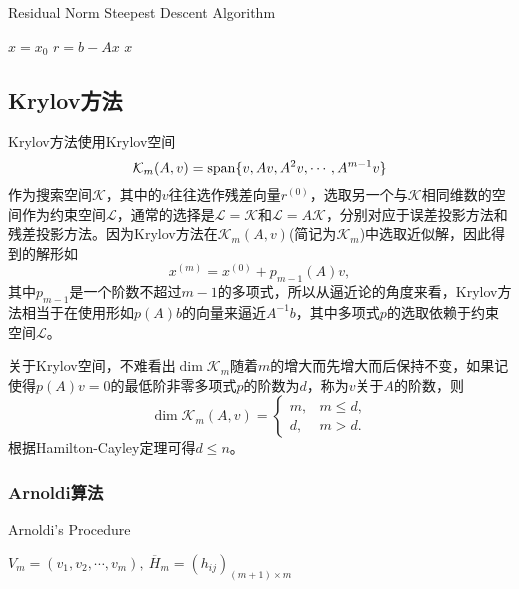 \documentclass[a4paper,10pt]{ctexart}
\begin{document}
\begin{algorithm}[htbp]
    \caption{Residual Norm Steepest Descent Algorithm}\label{alg:RSD}
    $ x = x_0 $\;
    $ r = b - Ax $\;
    \Return $ x $\;
\end{algorithm}
\newpage
\subsection{Krylov方法}
Krylov方法使用Krylov空间
\begin{equation}
    \mathcal{K}_m(A, v) = {\rm span}\{v, Av, A^2v, \cdots , A^{m-1}v\}
\end{equation}
作为搜索空间$ \mathcal{K} $，其中的$ v $往往选作残差向量$ r^{(0)} $，选取另一个与$ \mathcal{K} $相同维数的空间作为约束空间$ \mathcal{L} $，通常的选择是$ \mathcal{L} = \mathcal{K} $和$ \mathcal{L} = A \mathcal{K} $，分别对应于误差投影方法和残差投影方法。因为Krylov方法在$ \mathcal{K}_m(A,v) $(简记为$ \mathcal{K}_m $)中选取近似解，因此得到的解形如
\[
    x^{(m)} = x^{(0)} + p_{m-1}(A)v,
\]
其中$ p_{m-1} $是一个阶数不超过$ m-1 $的多项式，所以从逼近论的角度来看，Krylov方法相当于在使用形如$ p(A)b $的向量来逼近$ A^{-1}b $，其中多项式$ p $的选取依赖于约束空间$ \mathcal{L} $。

关于Krylov空间，不难看出$ \dim \mathcal{K}_m $随着$ m $的增大而先增大而后保持不变，如果记使得$ p(A)v=0 $的最低阶非零多项式$ p $的阶数为$ d $，称为$ v $关于$ A $的阶数，则
\[
    \dim \mathcal{K}_m(A,v) = \begin{cases}
        m, & m\leqslant d,\\
        d, & m>d.
    \end{cases}
\]
根据Hamilton-Cayley定理可得$ d\leqslant n $。

\subsubsection{Arnoldi算法}
\begin{algorithm}[htbp]
    \caption{Arnoldi's Procedure}\label{alg:Arnoldi}
    \Return $ V_m = (v_1, v_2, \cdots , v_m),\ \overline{H}_m = (h_{ij})_{(m+1)\times m} $\;
\end{algorithm}
\end{document}

